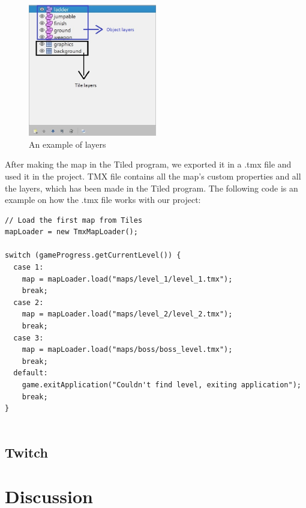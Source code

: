 \documentclass[12p]{article}
\begin{document}
\begin{figure}[ht]
  \centering
  \includegraphics[width=0.5\textwidth]{Documentation/layers}
  \caption{An example of layers}
  \label{fig:ExampleOfMapLayers}
\end{figure}


After making the map in the Tiled program, we exported it in a .tmx file and used it in the project. TMX file contains all the map’s custom properties and all the layers, which has been made in the Tiled program. The following code is an example on how the .tmx file works with our project:

\begin{verbatim}
// Load the first map from Tiles
mapLoader = new TmxMapLoader();

switch (gameProgress.getCurrentLevel()) {
  case 1:
    map = mapLoader.load("maps/level_1/level_1.tmx");
    break;
  case 2:
    map = mapLoader.load("maps/level_2/level_2.tmx");
    break;
  case 3:
    map = mapLoader.load("maps/boss/boss_level.tmx");
    break;
  default:
    game.exitApplication("Couldn't find level, exiting application");
    break;
}


\end{verbatim}



\subsection{Twitch} \label{Twitch}


\newpage
\section{Discussion}
\end{document}
